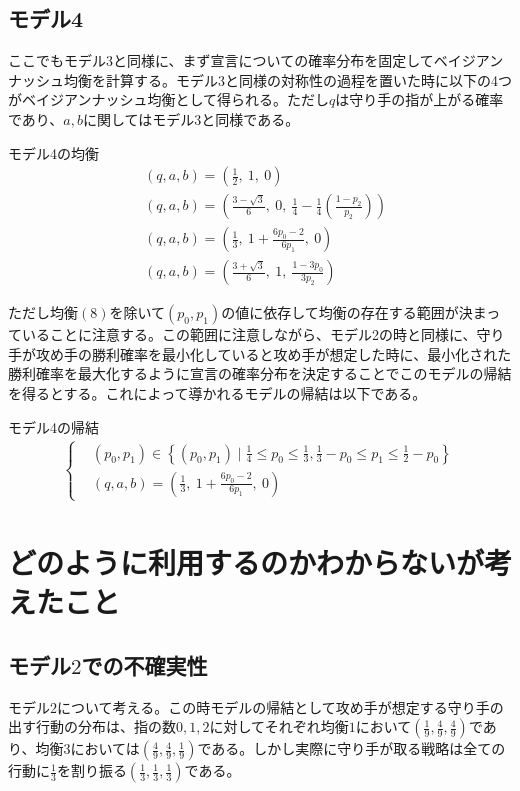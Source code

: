 \documentclass{jsarticle}
\begin{document}
\subsection{モデル4}
ここでもモデル3と同様に、まず宣言についての確率分布を固定してベイジアンナッシュ均衡を計算する。モデル3と同様の対称性の過程を置いた時に以下の4つがベイジアンナッシュ均衡として得られる。ただし$q$は守り手の指が上がる確率であり、$a,b$に関してはモデル3と同様である。
\begin{itembox}[l]{モデル4の均衡}
\begin{align}
&(q, a, b) = \left(\frac{1}{2},\ 1,\ 0\right)\\[7pt]
&(q, a, b) = \left(\frac{3 - \sqrt{3}}{6},\ 0,\ \frac{1}{4} - \frac{1}{4}\left( \frac{1-p_2}{p_2} \right) \right)\\[7pt]
&(q, a, b) = \left( \frac{1}{3},\ 1 + \frac{6p_0 - 2}{6p_1},\ 0 \right)\\[7pt]
&(q, a, b) = \left( \frac{3 + \sqrt{3}}{6},\ 1,\ \frac{1 - 3p_0}{3p_2} \right)
\end{align}
\end{itembox}
ただし均衡$(8)$を除いて$(p_0, p_1)$の値に依存して均衡の存在する範囲が決まっていることに注意する。この範囲に注意しながら、モデル2の時と同様に、守り手が攻め手の勝利確率を最小化していると攻め手が想定した時に、最小化された勝利確率を最大化するように宣言の確率分布を決定することでこのモデルの帰結を得るとする。これによって導かれるモデルの帰結は以下である。
\begin{itembox}[l]{モデル4の帰結}
\begin{align}
\begin{cases}
&(p_0, p_1) \in \left\{ (p_0, p_1) \mid \frac{1}{4} \leq p_0 \leq \frac{1}{3}, \frac{1}{3} -p_0 \leq p_1 \leq \frac{1}{2} - p_0 \right\}\\[6pt]
&(q, a, b) = \left( \frac{1}{3},\ 1 + \frac{6p_0 - 2}{6p_1},\ 0 \right)
\end{cases}
\end{align}
\end{itembox}

\section{どのように利用するのかわからないが考えたこと}
\subsection{モデル$2$での不確実性}
モデル$2$について考える。この時モデルの帰結として攻め手が想定する守り手の出す行動の分布は、指の数$0,1,2$に対してそれぞれ均衡$1$において$(\frac{1}{9}, \frac{4}{9}, \frac{4}{9})$であり、均衡$3$においては$(\frac{4}{9}, \frac{4}{9}, \frac{1}{9})$である。しかし実際に守り手が取る戦略は全ての行動に$\frac{1}{3}$を割り振る$(\frac{1}{3}, \frac{1}{3}, \frac{1}{3})$である。
\end{document}
